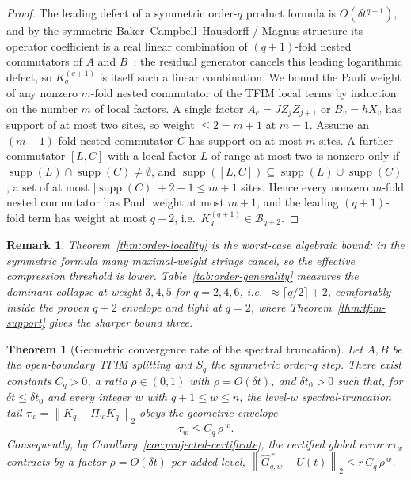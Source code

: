 \documentclass[aps,prxquantum,reprint,superscriptaddress,nofootinbib,amsmath,amssymb]{revtex4-2}
\newcommand{\tfim}{TFIM}
\newcommand{\norm}[1]{\left\lVert #1 \right\rVert}
\newcommand{\abs}[1]{\left\lvert #1 \right\rvert}
\newcommand{\supp}{\operatorname{supp}}
\newcommand{\cB}{\mathcal{B}}
\newcommand{\dt}{\delta t}
\newtheorem{theorem}{Theorem}
\newtheorem{remark}{Remark}
\begin{document}
\begin{proof}
The leading defect of a symmetric order-$q$ product formula is $O(\dt^{q+1})$, and by the symmetric Baker--Campbell--Hausdorff / Magnus structure its operator coefficient is a real linear combination of $(q{+}1)$-fold nested commutators of $A$ and $B$~\cite{magnus1954,blanes2009}; the residual generator cancels this leading logarithmic defect, so $K_q^{(q+1)}$ is itself such a linear combination. We bound the Pauli weight of any nonzero $m$-fold nested commutator of the \tfim{} local terms by induction on the number $m$ of local factors. A single factor $A_e=JZ_jZ_{j+1}$ or $B_v=hX_v$ has support of at most two sites, so weight $\le2=m+1$ at $m=1$. Assume an $(m{-}1)$-fold nested commutator $C$ has support on at most $m$ sites. A further commutator $[L,C]$ with a local factor $L$ of range at most two is nonzero only if $\supp(L)\cap\supp(C)\neq\emptyset$, and $\supp([L,C])\subseteq\supp(L)\cup\supp(C)$, a set of at most $\abs{\supp(C)}+2-1\le m+1$ sites. Hence every nonzero $m$-fold nested commutator has Pauli weight at most $m+1$, and the leading $(q{+}1)$-fold term has weight at most $q+2$, i.e.\ $K_q^{(q+1)}\in\cB_{q+2}$.
\end{proof}

\begin{remark}
Theorem~\ref{thm:order-locality} is the worst-case algebraic bound; in the symmetric formula many maximal-weight strings cancel, so the \emph{effective} compression threshold is lower. Table~\ref{tab:order-generality} measures the dominant collapse at weight $3,4,5$ for $q=2,4,6$, i.e.\ $\approx\lceil q/2\rceil+2$, comfortably inside the proven $q+2$ envelope and tight at $q=2$, where Theorem~\ref{thm:tfim-support} gives the sharper bound three.
\end{remark}

\begin{theorem}[Geometric convergence rate of the spectral truncation]
\label{thm:spectral-rate}
Let $A,B$ be the open-boundary \tfim{} splitting and $S_q$ the symmetric order-$q$ step. There exist constants $C_q>0$, a ratio $\rho\in(0,1)$ with $\rho=O(\dt)$, and $\dt_0>0$ such that, for $\dt\leq\dt_0$ and every integer $w$ with $q+1\leq w\leq n$, the level-$w$ spectral-truncation tail $\tau_w=\norm{K_q-\Pi_wK_q}_2$ obeys the \emph{geometric envelope}
\begin{equation}
    \tau_w\leq C_q\,\rho^{\,w}.
    \label{eq:spectral-rate}
\end{equation}
Consequently, by Corollary~\ref{cor:projected-certificate}, the certified global error $r\tau_w$ contracts by a factor $\rho=O(\dt)$ per added level, $\norm{\widehat G_{q,w}^{\,r}-U(t)}_2\leq r\,C_q\,\rho^{\,w}$.
\end{theorem}
\end{document}
